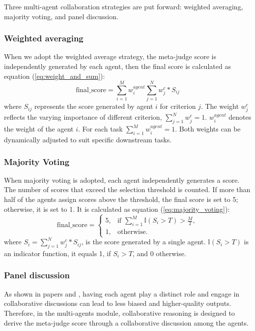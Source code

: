 \documentclass{article}
\theoremstyle{plain}
\theoremstyle{definition}
\theoremstyle{remark}
\begin{document}
Three multi-agent collaboration strategies are put forward: weighted averaging, majority voting, and panel discussion.

\subsubsection{Weighted averaging}
When we adopt the weighted average strategy, the meta-judge score is independently generated by each agent, then the final score is calculated as equation (\ref{eq:weight_and_sum}): 
\begin{equation}
    \text{final\_score} = \sum\limits_{i=1}^{M}w_{i}^{agent}\sum\limits_{j=1}^{N}{w_j^{c}}*S_{ij}
    \label{eq:weight_and_sum}
\end{equation}
where $S_{ij}$ represents the score generated by agent $i$ for criterion $j$.
The weight $w^c_j$ reflects the varying importance of different criterion, $\sum_{j=1}^{N}{w_j^{c}}=1$. 
${w_{i}^{agent}}$ denotes the weight of the agent $i$.
For each task $\sum_{i=1}^{M}{w_{i}^{agent}}=1$. 
Both weights can be dynamically adjusted to suit specific downstream tasks.

\subsubsection{Majority Voting}
When majority voting is adopted, each agent independently generates a score. The number of scores that exceed the selection threshold is counted. If more than half of the agents assign scores above the threshold, the final score is set to 5; otherwise, it is set to 1. It is calculated as equation (\ref{eq:majority_voting}):
\begin{equation}
    \text{final\_score} =
    \begin{cases}
        5, & \text{if } \sum_{i=1}^{M} \mathbb{I}(S_i > T) > \frac{M}{2}, \\
        1, & \text{otherwise}.
    \end{cases}
    \label{eq:majority_voting}
\end{equation}
where $S_i = \sum\limits_{j=1}^{N}{w_j^{c}}*S_{ij}$, is the score generated by a single agent. $\mathbb{I}(S_i > T)$ is an indicator function, it equals 1, if $S_i > T$, and $0$ otherwise.

\subsubsection{Panel discussion}
As shown in papers \cite{li2024matevalmultiagentdiscussionframework} and \cite{chan2023chateval}, having each agent play a distinct role and engage in collaborative discussions can lead to less biased and higher-quality outputs.
Therefore, in the multi-agents module, collaborative reasoning is designed to derive the meta-judge score through a collaborative discussion among the agents.
\end{document}
